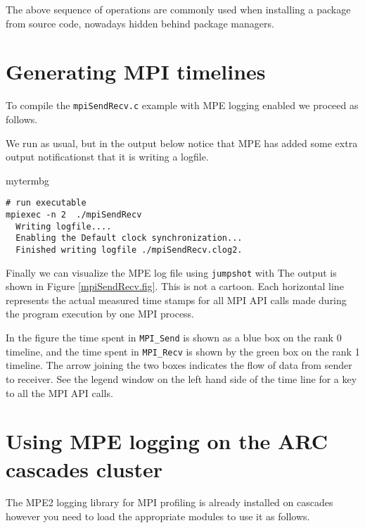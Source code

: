 The above sequence of operations are commonly used when installing a package from source code, nowadays hidden behind package managers.

\section{Generating MPI timelines}

To compile the \texttt{mpiSendRecv.c} example with MPE logging enabled we proceed as follows.


We run as usual, but in the output below notice that MPE has added some extra output notificationst that it is writing a logfile.
\begin{tsession}{mytermbg}
\begin{Verbatim}[frame=single]
# run executable
mpiexec -n 2  ./mpiSendRecv
  Writing logfile....
  Enabling the Default clock synchronization...
  Finished writing logfile ./mpiSendRecv.clog2.
\end{Verbatim}
\end{tsession}

Finally we can visualize the MPE log file using \texttt{jumpshot} with
The output is shown in Figure \ref{mpiSendRecv.fig}. This is not a cartoon. Each horizontal line represents the actual measured time stamps for all MPI API calls made during the program execution by one MPI process.

 In the figure the time spent in \texttt{MPI\_Send} is shown as a blue box on the rank 0 timeline, and the time spent in \texttt{MPI\_Recv} is shown by the green box on the rank 1 timeline. The arrow joining the two boxes indicates the flow of data from sender to receiver. See the legend window on the left hand side of the time line for a key to all the MPI API calls.

\section{Using MPE logging on the ARC cascades cluster}

The MPE2 logging library for MPI profiling is already installed on cascades however you need to load the appropriate modules to use it as follows.

